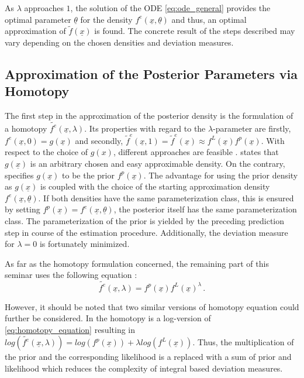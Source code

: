 \documentclass[a4paper]{IEEEtran}
\begin{document}
As $\lambda$ approaches $1$, the solution of the ODE \eqref{eq:ode_general} provides the optimal parameter $\underline{\theta}$ for the density $f^e(\underline{x}, \underline{\theta})$ and thus, an optimal approximation of $\tilde{f}(\underline{x})$ is found. The concrete result of the steps 
described may vary depending on the chosen densities and deviation measures.

\subsection{Approximation of the Posterior Parameters via Homotopy}
\label{ch:approx_posterior_homotopy}
 The first step in the approximation of the posterior density is the formulation of a homotopy $\tilde{f^e}(\underline{x},\lambda)$. 
 Its properties with regard to the $\lambda$-parameter are firstly,  $f^e(\underline{x}, 0) = g(\underline{x})$ and secondly, $\tilde{f}^e(\underline{x}, 1) = \tilde{f}^{e}(\underline{x}) \approx  f^{L}(\underline{x}) f^{p}(\underline{x})$.
 With respect to the choice of $g(x)$, different approaches are feasible . \cite{hanebeck2003} states that $g(\underline{x})$ is an arbitrary chosen and easy approximable density. On the contrary, \cite{hagmar2011} specifies $g(\underline{x})$ to be the prior
 $f^p(\underline{x})$. The advantage for using the prior density as $g(\underline{x})$ is coupled with the choice of the starting approximation density $f^e(\underline{x}, \underline{\theta})$. If both densities have the same parameterization class, this is ensured by setting
 $f^p(\underline{x}) = f^e(\underline{x}, \underline{\theta})$, the posterior itself has the same parameterization class. The parameterization of the prior is yielded by the preceding prediction step in course of the estimation procedure.
Additionally, the deviation measure for $\lambda = 0$ is fortunately minimized.

 As far as the homotopy formulation concerned, the remaining part of this seminar uses the following equation \cite{hagmar2011}:
 \begin{equation}
    \tilde{f^e}(\underline{x},\lambda) = f^p(\underline{x})f^L(\underline{x})^{\lambda} \,.
    \label{eq:homotopy_equation}
 \end{equation}

However, it should be noted that two similar versions of homotopy equation could further be considered. In \cite{daum2007} the homotopy is a log-version of \eqref{eq:homotopy_equation}
resulting in $log(\tilde{f^e}(\underline{x},\lambda)) = log(f^p(\underline{x})) + \lambda log(f^L(\underline{x}))$. Thus, the multiplication of the prior and the corresponding likelihood is a replaced with a sum of prior and likelihood which reduces the 
complexity of integral based deviation measures.
\end{document}
